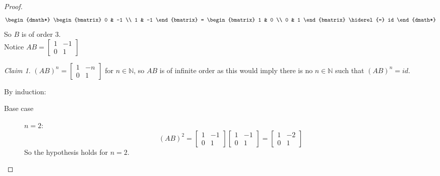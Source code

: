 \documentclass{article}
\theoremstyle{definition}
\theoremstyle{remark}
\newtheorem*{claim}{Claim}
\newcommand{\N}{\mathbb{N}}
\begin{document}
\begin{proof}
\begin{dgroup*}
\begin{dmath*}
\begin{bmatrix}
					0 & -1 \\ 
					1 & -1
				\end{bmatrix} = \begin{bmatrix}
					1 & 0 \\ 
					0 & 1
				\end{bmatrix} \hiderel{=} id
			\end{dmath*}
		\end{dgroup*} So $B$ is of order $3$. \\
		Notice $AB=\left[\begin{smallmatrix}
			1 & -1 \\ 
			0 & 1
		\end{smallmatrix} \right]$
		\begin{claim}
			$\left(AB\right)^n=\left[\begin{smallmatrix}
			1 & -n \\ 
			0 & 1
			\end{smallmatrix} \right]$ for $n\in\N$, so $AB$ is of infinite order as this would imply there is no $n\in\N$ such that $\left(AB\right)^n=id$. 
			
			By induction:
			\begin{description}
				\item[Base case] $n=2$:\\
				\begin{dmath*}
					\left(AB\right)^2 = \begin{bmatrix}
						1 & -1 \\ 
						0 & 1
					\end{bmatrix}\begin{bmatrix}
						1 & -1 \\ 
						0 & 1
					\end{bmatrix} = \begin{bmatrix}
						1 & -2 \\ 
						0 & 1
					\end{bmatrix} 
				\end{dmath*} So the hypothesis holds for $n=2$. \checkmark
			

\end{description}
\end{claim}
\end{proof}
\end{document}
